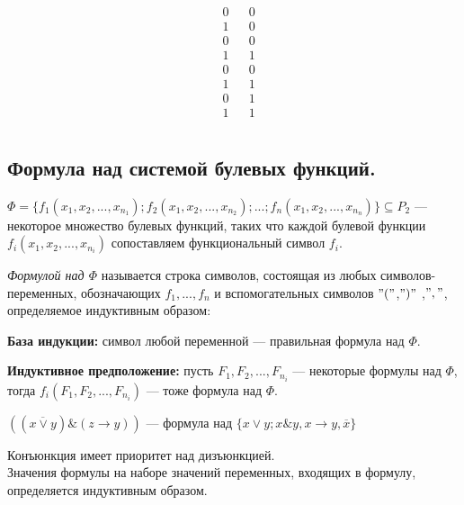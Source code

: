 \begin{enumerate}
$$\begin{array}{rrr|c}
	&
	\begin{array}{r}
	0\\ 1\\ 0\\ 1\\ 0\\ 1\\ 0\\ 1\\
	\end{array}
	&
	\begin{array}{r}
	0\\ 0\\ 0\\ 1\\ 0\\ 1\\ 1\\ 1\\
	\end{array}
	\end{array}
	$$
\end{enumerate}	


\subsection{Формула над системой булевых функций.}
$\Phi=\{f_{1}(x_{1},x_{2},...,x_{n_1});f_{2}(x_{1},x_{2},...,x_{n_2});...;f_{n}(x_{1},x_{2},...,x_{n_n})\}\subseteq P_2$ --- некоторое множество булевых функций, таких что каждой булевой функции $f_{i}(x_{1},x_{2},...,x_{n_i})$ сопоставляем функциональный символ $f_{i}$.
\begin{definition}

	\textit{Формулой над $\Phi$} называется строка символов, состоящая из любых символов-переменных, обозначающих $f_1,...,f_n$ и вспомогательных символов $"("$,$")"$ ,$","$, определяемое индуктивным образом: 

\textbf{База индукции:} символ любой переменной --- правильная формула над $\Phi$.

\textbf{Индуктивное предположение: } пусть $F_1,F_2,...,F_{n_i}$ --- некоторые формулы над $\Phi$, тогда $f_i(F_1,F_2,...,F_{n_i})$ --- тоже формула над $\Phi$.

\end{definition}
\begin{example}
	$((\overline{x\vee y}) \& (z\rightarrow y ))$ --- формула над $\{x \vee y; x \& y, x \rightarrow y, \overline{x} \}$\\
\end{example}
Конъюнкция имеет приоритет над дизъюнкцией.\\
\newpage
Значения формулы на наборе значений переменных, входящих в формулу, определяется индуктивным образом.


